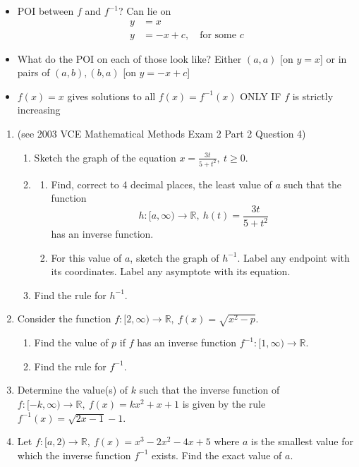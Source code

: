 \documentclass[12pt]{article}
\begin{document}
\begin{itemize}
    \item POI between $f$ and $f^{-1}$? Can lie on 
    \begin{align*}
        y &= x \\
        y &= -x + c, \quad \text{for some }c
    \end{align*}
    \item What do the POI on each of those look like? Either $(a,a)$ [on $y = x$] or in pairs of $(a,b),(b,a)$ [on $y = -x + c$]
    
    \item $f(x) = x$ gives solutions to all $f(x) = f^{-1}(x)$ ONLY IF $f$ is strictly increasing

\end{itemize}


    \begin{enumerate}
    \item (see 2003 VCE Mathematical Methods Exam 2 Part 2 Question 4)

    \begin{enumerate}
        \item[a.] Sketch the graph of the equation $x = \frac{3t}{5+t^2}, \ t \geq 0$.
        \item[b.] 
        \begin{enumerate}
            \item[i.] Find, correct to 4 decimal places, the least value of $a$ such that the function 
            \[ h: [a, \infty) \to \mathbb{R}, \ h(t) = \frac{3t}{5+t^2} \]
            has an inverse function.
            \item[ii.] For this value of $a$, sketch the graph of $h^{-1}$. Label any endpoint with its coordinates. Label any asymptote with its equation.
        \end{enumerate}
        \item[c.] Find the rule for $h^{-1}$.
    \end{enumerate}

    \item Consider the function $f: [2, \infty) \to \mathbb{R}, \ f(x) = \sqrt{x^2 - p}$.

        \begin{enumerate}
            \item[a.] Find the value of $p$ if $f$ has an inverse function $f^{-1}: [1, \infty) \to \mathbb{R}$.
            \item[b.] Find the rule for $f^{-1}$.
        \end{enumerate}

    \item Determine the value(s) of $k$ such that the inverse function of $f: [-k, \infty) \to \mathbb{R}, \ f(x) = kx^2 + x + 1$ is given by the rule $f^{-1}(x) = \sqrt{2x - 1} - 1$.

    \item Let $f: [a, 2) \to \mathbb{R}, \ f(x) = x^3 - 2x^2 - 4x + 5$ where $a$ is the smallest value for which the inverse function $f^{-1}$ exists. Find the exact value of $a$.
\end{enumerate}
\end{document}
